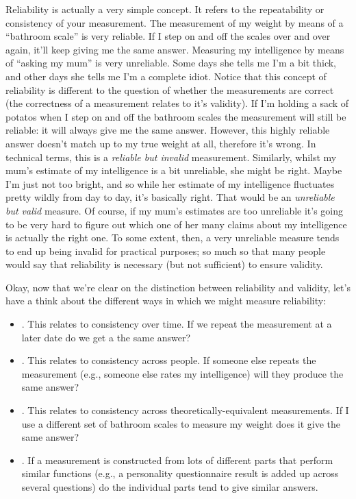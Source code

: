 Reliability is actually a very simple concept. It refers to the repeatability or consistency of your measurement. The measurement of my weight by means of a ``bathroom scale'' is very reliable. If I step on and off the scales over and over again, it'll keep giving me the same answer. Measuring my intelligence by means of ``asking my mum'' is very unreliable. Some days she tells me I'm a bit thick, and other days she tells me I'm a complete idiot. Notice that this concept of reliability is different to the question of whether the measurements are correct (the correctness of a measurement relates to it's validity). If I'm holding a sack of potatos when I step on and off the bathroom scales the measurement will still be reliable: it will always give me the same answer. However, this highly reliable answer doesn't match up to my true weight at all, therefore it's wrong. In technical terms, this is a {\it reliable but invalid} measurement. Similarly, whilst my mum's estimate of my intelligence is a bit unreliable, she might be right. Maybe I'm just not too bright, and so while her estimate of my intelligence fluctuates pretty wildly from day to day, it's basically right. That would be an {\it unreliable but valid} measure. Of course, if my mum's estimates are too unreliable it's going to be very hard to figure out which one of her many claims about my intelligence is actually the right one. To some extent, then, a very unreliable measure tends to end up being invalid for practical purposes; so much so that many people would say that reliability is necessary (but not sufficient) to ensure validity. 

Okay, now that we're clear on the distinction between reliability and validity, let's have a think about the different ways in which we might measure reliability:

\begin{itemize}
\item {}. This relates to consistency over time. If we repeat the measurement at a later date do we get a the same answer?
\item {}. This relates to consistency across people. If someone else repeats the measurement (e.g., someone else rates my intelligence) will they produce the same answer?
\item {}. This relates to consistency across theoretically-equivalent measurements. If I use a different set of bathroom scales to measure my weight does it give the same answer?
\item {}. If a measurement is constructed from lots of different parts that perform similar functions (e.g., a personality questionnaire result is added up across several questions) do the individual parts tend to give similar answers. 
\end{itemize}

